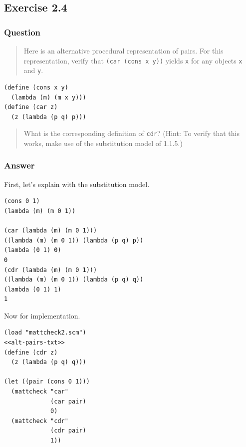 \documentclass[final,fleqn,titlepage,twoside]{article}
\begin{document}
\subsection{Exercise 2.4}
\label{sec:org2e1eb6d}
\subsubsection{Question}
\label{sec:org201ed6c}
\begin{quote}
Here is an alternative procedural representation of pairs. For this
representation, verify that \texttt{(car (cons x y))} yields \texttt{x} for any
objects \texttt{x} and \texttt{y}.
\end{quote}

\begin{verbatim}
(define (cons x y)
  (lambda (m) (m x y)))
(define (car z)
  (z (lambda (p q) p)))
\end{verbatim}

\begin{quote}
What is the corresponding definition of \texttt{cdr}? (Hint: To verify that
this works, make use of the substitution model of 1.1.5.)
\end{quote}

\subsubsection{Answer}
\label{sec:orga7af9f5}
First, let's explain with the substitution model.
\begin{verbatim}
(cons 0 1)
(lambda (m) (m 0 1))

(car (lambda (m) (m 0 1)))
((lambda (m) (m 0 1)) (lambda (p q) p))
(lambda (0 1) 0)
0
(cdr (lambda (m) (m 0 1)))
((lambda (m) (m 0 1)) (lambda (p q) q))
(lambda (0 1) 1)
1
\end{verbatim}

Now for implementation.
\begin{verbatim}
(load "mattcheck2.scm")
<<alt-pairs-txt>>
(define (cdr z)
  (z (lambda (p q) q)))

(let ((pair (cons 0 1)))
  (mattcheck "car"
             (car pair)
             0)
  (mattcheck "cdr"
             (cdr pair)
             1))
\end{verbatim}
\end{document}
